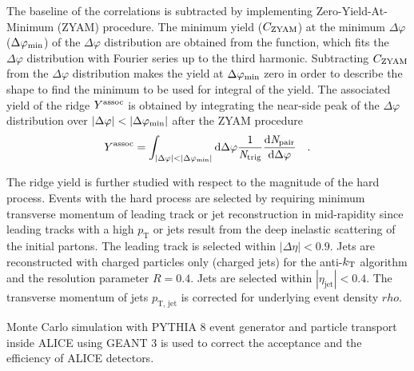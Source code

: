 The baseline of the correlations is subtracted by implementing Zero-Yield-At-Minimum (ZYAM) procedure. The minimum yield ($C_{\rm{ZYAM}}$) at the minimum $\Delta\varphi$($\Delta\varphi_{\rm{min}}$) of the $\Delta\varphi$ distribution are obtained from the function, which fits the $\Delta\varphi$ distribution with Fourier series up to the third harmonic. Subtracting $C_{\rm{ZYAM}}$ from the $\Delta\varphi$ distribution makes the yield at $\Delta\varphi_{\rm{min}}$ zero in order to describe the shape to find the minimum to be used for integral of the yield. The associated yield of the ridge $Y^{\rm{assoc}}$ is obtained by integrating the near-side peak of the $\Delta\varphi$ distribution over $|\Delta\varphi|<|\Delta\varphi_{\rm{min}}|$ after the ZYAM procedure
\begin{eqnarray}
Y^{\rm{assoc}} = \int_{|\Delta \varphi| < |\Delta\varphi_{\rm{min}}| } \rm{d} \Delta\varphi \frac{1}{\it{N}_{\rm{trig}}} \frac{ \rm{d}\it{}N_{\rm{pair}} }{ \rm{d}\Delta\varphi } \quad.
\end{eqnarray}

The ridge yield is further studied with respect to the magnitude of the hard process. Events with the hard process are selected by requiring minimum transverse momentum of leading track or jet reconstruction in mid-rapidity since leading tracks with a high $p_\mathrm{T}$ or jets result from the deep inelastic scattering of the initial partons. The leading track is selected within $|\Delta\eta|<0.9$. Jets are reconstructed with charged particles only (charged jets) for the anti-$k_{\rm{T}}$ algorithm and the resolution parameter $R = 0.4$. Jets are selected within $|\eta_\mathrm{jet}|<0.4$. The transverse momentum of jets $p_\mathrm{T,\,jet}$ is corrected for underlying event density $rho$.

Monte Carlo simulation with PYTHIA 8 event generator and particle transport inside ALICE using GEANT 3 is used to correct the acceptance and the efficiency of ALICE detectors. 


